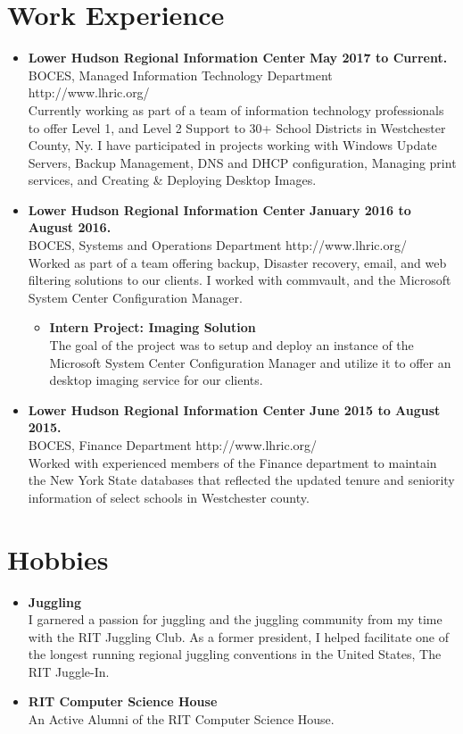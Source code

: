 \documentclass[10pt]{Article}
\begin{document}
\section*{Work Experience}
\begin{itemize}[topsep=1ex, itemsep=.5ex, parsep=0ex, partopsep=.75ex]
	\item[]{{\bf Lower Hudson Regional Information Center} \hfill {\bf May 2017 to Current.}}\\
	BOCES, Managed Information Technology Department \hfill http://www.lhric.org/\\
	Currently working as part of a team of information technology professionals to offer Level 1, and Level 2 Support to 30+ School Districts in Westchester County, Ny.
	I have participated in projects working with Windows Update Servers, Backup Management, DNS and DHCP configuration, Managing print services, and Creating \& Deploying Desktop Images.
	\item[]{{\bf Lower Hudson Regional Information Center} \hfill {\bf January 2016 to August 2016.}}\\
	BOCES, Systems and Operations Department \hfill http://www.lhric.org/\\
	Worked as part of a team offering backup, Disaster recovery, email, and web filtering solutions to our clients. I worked with commvault, and the Microsoft System Center Configuration Manager.
	\begin{itemize}[topsep=1ex, itemsep=.5ex, parsep=0ex, partopsep=.75ex]
		\item[]{\bf Intern Project: Imaging Solution}\\
		The goal of the project was to setup and deploy an instance of the Microsoft System Center Configuration Manager and utilize it to offer an desktop imaging service for our clients. 
	\end{itemize}
	\item[]{{\bf Lower Hudson Regional Information Center} \hfill {\bf June 2015 to August 2015.}}\\
	BOCES, Finance Department \hfill http://www.lhric.org/\\
	Worked with experienced members of the Finance department to maintain the New York
	State databases that reflected the updated tenure and seniority information of select schools in Westchester county.
\end{itemize}

\section*{Hobbies}
\begin{itemize}[topsep=1ex, itemsep=.5ex, parsep=0ex, partopsep=.75ex]
	\item[]{\bf Juggling}\\
	I garnered a passion for juggling and the juggling community from my time with the RIT Juggling Club. As a former president, I helped facilitate one of the longest running regional juggling conventions in the United States, The RIT Juggle-In.

	\item[]{\bf RIT Computer Science House}\\
	An Active Alumni of the RIT Computer Science House.
\end{itemize}
\end{document}
